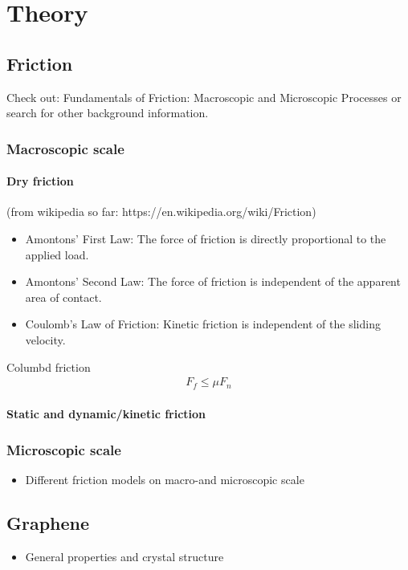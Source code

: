 \newpage
\chapter*{Theory}



\section{Friction}
Check out: Fundamentals of Friction: Macroscopic and Microscopic Processes
or search for other background information. 
\subsection{Macroscopic scale}
\subsubsection{Dry friction} (from wikipedia so far: https://en.wikipedia.org/wiki/Friction)
\begin{itemize}
    \item Amontons' First Law: The force of friction is directly proportional to the applied load.
    \item Amontons' Second Law: The force of friction is independent of the apparent area of contact.
    \item Coulomb's Law of Friction: Kinetic friction is independent of the sliding velocity.
\end{itemize}
Columbd friction 
\begin{align*}
    F_f \le \mu F_n
\end{align*}

\subsubsection*{Static and dynamic/kinetic friction}

\subsection{Microscopic scale}


\begin{itemize}
  \item Different friction models on macro-and microscopic scale
\end{itemize}
\section{Graphene}
\begin{itemize}
  \item General properties and crystal structure
\end{itemize}
